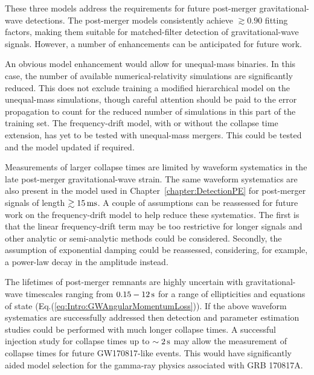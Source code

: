 \documentclass[../Thesis.tex]{subfiles}
\begin{document}
    These three models address the requirements for future post-merger gravitational-wave detections.
    The post-merger models consistently achieve $\gtrsim 0.90$ fitting factors, making them suitable for matched-filter detection of gravitational-wave signals.
    However, a number of enhancements can be anticipated for future work. \par
    
    An obvious model enhancement would allow for unequal-mass binaries.
    In this case, the number of available numerical-relativity simulations are significantly reduced.
    This does not exclude training a modified hierarchical model on the unequal-mass simulations, though careful attention should be  paid to the error propagation to count for the reduced number of simulations in this part of the training set.
    The frequency-drift model, with or without the collapse time extension, has yet to be tested with unequal-mass mergers.
    This could be tested and the model updated if required. \par
    
    Measurements of larger collapse times are limited by waveform systematics in the late post-merger gravitational-wave strain.
    The same waveform systematics are also present in the model used in Chapter~\ref{chapter:DetectionPE} for post-merger signals of length $\gtrsim 15\,\mathrm{ms}$.
    A couple of assumptions can be reassessed for future work on the frequency-drift model to help reduce these systematics. 
    The first is that the linear frequency-drift term may be too restrictive for longer signals and other analytic or semi-analytic methods could be considered.
    Secondly, the assumption of exponential damping could be reassessed, considering, for example, a power-law decay in the amplitude instead.
    \par

    The lifetimes of post-merger remnants are highly uncertain with gravitational-wave timescales ranging from $0.15-12\,\mathrm{s}$ for a range of ellipticities and equations of state (Eq.(\ref{eq:Intro:GWAngularMomentumLoss})).
    If the above waveform systematics are successfully addressed then detection and parameter estimation studies could be performed with much longer collapse times. 
    A successful injection study for collapse times up to $\sim 2\,\mathrm{s}$ may allow the measurement of collapse times for future GW170817-like events.
    This would have significantly aided model selection for the gamma-ray physics associated with GRB 170817A.\par
\end{document}
